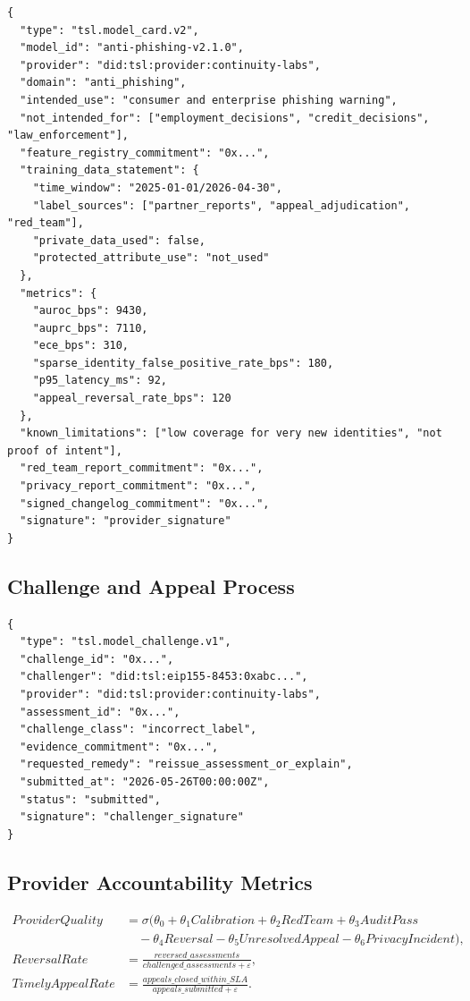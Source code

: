 \documentclass[11pt]{article}
\begin{document}
\begin{lstlisting}[style=tslcode]
{
  "type": "tsl.model_card.v2",
  "model_id": "anti-phishing-v2.1.0",
  "provider": "did:tsl:provider:continuity-labs",
  "domain": "anti_phishing",
  "intended_use": "consumer and enterprise phishing warning",
  "not_intended_for": ["employment_decisions", "credit_decisions", "law_enforcement"],
  "feature_registry_commitment": "0x...",
  "training_data_statement": {
    "time_window": "2025-01-01/2026-04-30",
    "label_sources": ["partner_reports", "appeal_adjudication", "red_team"],
    "private_data_used": false,
    "protected_attribute_use": "not_used"
  },
  "metrics": {
    "auroc_bps": 9430,
    "auprc_bps": 7110,
    "ece_bps": 310,
    "sparse_identity_false_positive_rate_bps": 180,
    "p95_latency_ms": 92,
    "appeal_reversal_rate_bps": 120
  },
  "known_limitations": ["low coverage for very new identities", "not proof of intent"],
  "red_team_report_commitment": "0x...",
  "privacy_report_commitment": "0x...",
  "signed_changelog_commitment": "0x...",
  "signature": "provider_signature"
}
\end{lstlisting}

\subsection{Challenge and Appeal Process}

\begin{lstlisting}[style=tslcode]
{
  "type": "tsl.model_challenge.v1",
  "challenge_id": "0x...",
  "challenger": "did:tsl:eip155-8453:0xabc...",
  "provider": "did:tsl:provider:continuity-labs",
  "assessment_id": "0x...",
  "challenge_class": "incorrect_label",
  "evidence_commitment": "0x...",
  "requested_remedy": "reissue_assessment_or_explain",
  "submitted_at": "2026-05-26T00:00:00Z",
  "status": "submitted",
  "signature": "challenger_signature"
}
\end{lstlisting}

\subsection{Provider Accountability Metrics}

\begin{align}
ProviderQuality &= \sigma(\theta_0+\theta_1Calibration+\theta_2RedTeam+\theta_3AuditPass\\
&\quad-\theta_4Reversal-\theta_5UnresolvedAppeal-\theta_6PrivacyIncident),\\
ReversalRate &= \frac{reversed\_assessments}{challenged\_assessments+\varepsilon},\\
TimelyAppealRate &= \frac{appeals\_closed\_within\_SLA}{appeals\_submitted+\varepsilon}.
\end{align}
\end{document}
